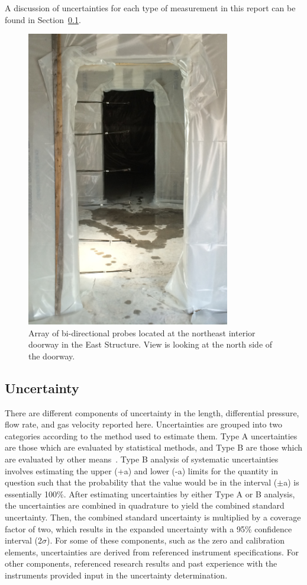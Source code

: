 \documentclass[12pt,oneside]{book}
\begin{document}
A discussion of uncertainties for each type of measurement in this report can be found in Section~\ref{sec:uncertainty}.

\begin{figure}[!ht]
	\includegraphics[width=3.5in]{../Figures/Pictures/BDPs_east}
	\caption[Array of bi-directional probes at interior doorway in East Structure.]{Array of bi-directional probes located at the northeast interior doorway in the East Structure. View is looking at the north side of the doorway.}
	\label{fig:BDPs}
\end{figure}
\FloatBarrier

\subsection{Uncertainty}
\label{sec:uncertainty}
There are different components of uncertainty in the length, differential pressure, flow rate, and gas velocity reported here. Uncertainties are grouped into two categories according to the method used to estimate them. Type A uncertainties are those which are evaluated by statistical methods, and Type B are those which are evaluated by other means~\cite{Taylor&Kuyatt:1994}. Type B analysis of systematic uncertainties involves estimating the upper (+a) and lower (-a) limits for the quantity in question such that the probability that the value would be in the interval ($\pm$a) is essentially 100\%. After estimating uncertainties by either Type A or B analysis, the uncertainties are combined in quadrature to yield the combined standard uncertainty. Then, the combined standard uncertainty is multiplied by a coverage factor of two, which results in the expanded uncertainty with a 95\% confidence interval (2$\sigma$). For some of these components, such as the zero and calibration elements, uncertainties are derived from referenced instrument specifications. For other components, referenced research results and past experience with the instruments provided input in the uncertainty determination. 
\end{document}
